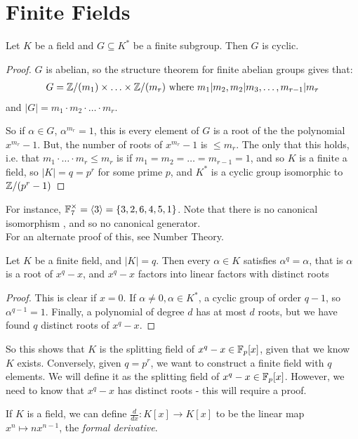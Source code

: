 \documentclass[10pt,a4paper]{article}
\begin{document}
\section{Finite Fields}
\begin{proposition}
Let $K$ be a field and $G\subseteq K^\ast$ be a finite subgroup. Then $G$ is cyclic.
\end{proposition}
\begin{proof}
$G$ is abelian, so the structure theorem for finite abelian groups gives that:
\begin{align*}
G = \mathbb{Z}/(m_1) \times \ldots \times \mathbb{Z}/(m_r) \text{ where } m_1|m_2, m_2|m_3, \ldots, m_{r-1}|m_r
\end{align*}
and $|G|=m_1\cdot m_2 \cdot\ldots\cdot m_r$.

So if $\alpha \in G$, $\alpha^{m_r} = 1$, this is every element of $G$ is a root of the the polynomial $x^{m_r} - 1$. But, the number of roots of $x^{m_r} -1$ is $\leq m_r$. The only that this holds, i.e. that $m_1\cdot\ldots\cdot m_r\leq m_r$ is if $m_1 = m_2 = \ldots = m_{r-1} = 1$, and so $K$ is a finite a field, so $|K| = q = p^r$ for some prime $p$, and $K^\ast$ is a cyclic group isomorphic to $\mathbb{Z}/(p^r-1)$
\end{proof}
For instance, $\mathbb{F}_7^\times = \langle 3\rangle = \{3,2,6,4,5,1\}$.  Note that there is no canonical isomorphism , and so no canonical generator.\\
For an alternate proof of this, see Number Theory.

\begin{lemma}
Let $K$ be a finite field, and $|K|=q$. Then every $\alpha\in K$ satisfies $\alpha^q = \alpha$, that is $\alpha$ is a root of $x^q - x$, and $x^q-x$ factors into linear factors with distinct roots
\end{lemma}
\begin{proof}
This is clear if $x=0$. If $\alpha\neq 0, \alpha\in K^\ast$, a cyclic group of order $q-1$, so $\alpha^{q-1} = 1$. Finally, a polynomial of degree $d$ has at most $d$ roots, but we have found $q$ distinct roots of $x^q-x$.
\end{proof}
So this shows that $K$ is the splitting field of $x^q-x \in \mathbb{F}_p[x]$, given that we know $K$ exists. Conversely, given $q = p^r$, we want to construct a finite field with $q$ elements. We will define it as the splitting field of $x^q-x\in \mathbb{F}_p[x]$. However, we need to know that $x^q-x$ has distinct roots - this will require a proof.

If $K$ is a field, we can define $\frac{d}{dx}:K[x] \rightarrow K[x]$ to be the linear map $x^n \mapsto nx^{n-1}$, the \emph{formal derivative}.
\end{document}
